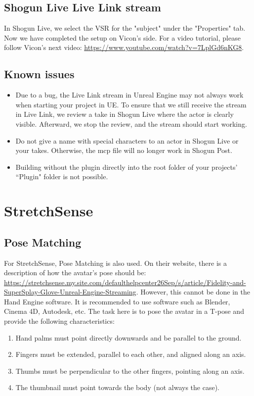 \documentclass{uva-inf-article}
\begin{document}
\subsection{Shogun Live Live Link stream}
In Shogun Live, we select the VSR for the "subject" under the "Properties" tab. Now we have completed the setup on Vicon's side. For a video tutorial, please follow Vicon's next video: \url{https://www.youtube.com/watch?v=7LplGd6nKG8}.

\subsection{Known issues}
\begin{itemize}
    \item Due to a bug, the Live Link stream in Unreal Engine may not always work when starting your project in UE. To ensure that we still receive the stream in Live Link, we review a take in Shogun Live where the actor is clearly visible. Afterward, we stop the review, and the stream should start working.
    \item Do not give a name with special characters to an actor in Shogun Live or your takes. Otherwise, the mcp file will no longer work in Shogun Post.
    \item Building without the plugin directly into the root folder of your projects' ``Plugin" folder is not possible.
\end{itemize}



\section{StretchSense}
\subsection{Pose Matching}
For StretchSense, Pose Matching is also used. On their website, there is a description of how the avatar's pose should be: \url{https://stretchsense.my.site.com/defaulthelpcenter26Sep/s/article/Fidelity-and-SuperSplay-Glove-Unreal-Engine-Streaming}. However, this cannot be done in the Hand Engine software. It is recommended to use software such as Blender, Cinema 4D, Autodesk, etc. The task here is to pose the avatar in a T-pose and provide the following characteristics:
\begin{enumerate}
    \item Hand palms must point directly downwards and be parallel to the ground.
    \item Fingers must be extended, parallel to each other, and aligned along an axis.
    \item Thumbs must be perpendicular to the other fingers, pointing along an axis.
    \item The thumbnail must point towards the body (not always the case).
\end{enumerate}
\end{document}
